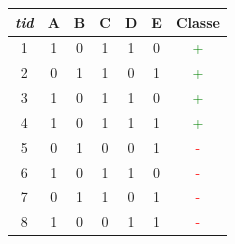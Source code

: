 \documentclass[a4paper,10pt]{report}
\begin{document}
\begin{center}
	\begin{tabular}{|c|c|c|c|c|c|c|}
		\hline
		\emph{tid} & A & B & C & D & E & Classe \\
		\hline
		1 & 1 & 0 & 1 & 1 & 0 & \textcolor{green}{+}\\
		\hline
		2 & 0 & 1 & 1 & 0 & 1 & \textcolor{green}{+}\\
		\hline
		3 & 1 & 0 & 1 & 1 & 0 & \textcolor{green}{+}\\
		\hline
		4 & 1 & 0 & 1 & 1 & 1 & \textcolor{green}{+}\\
		\hline
		5 & 0 & 1 & 0 & 0 & 1 & \textcolor{red}{-}\\
		\hline
		6 & 1 & 0 & 1 & 1 & 0 & \textcolor{red}{-}\\
		\hline
		7 & 0 & 1 & 1 & 0 & 1 & \textcolor{red}{-}\\	
		\hline
		8 & 1 & 0 & 0 & 1 & 1 & \textcolor{red}{-}\\	
		\hline		
	\end{tabular}
\end{center}
\end{document}
